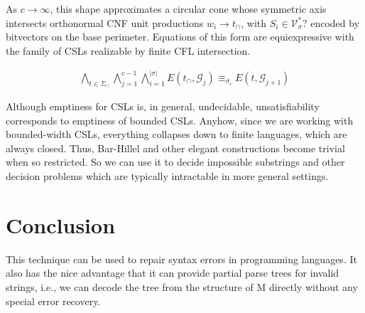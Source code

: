 \documentclass[sigplan,nonacm,anonymous]{acmart}\settopmatter{printfolios=false,printccs=false,printacmref=false}
\begin{document}
  \noindent As $c \rightarrow \infty$, this shape approximates a circular cone whose symmetric axis intersects orthonormal CNF unit productions $w_i \rightarrow t_\cap$, with $S_i \in \mathcal{V}^*_{\sigma}?$ encoded by bitvectors on the base perimeter. Equations of this form are equiexpressive with the family of CSLs realizable by finite CFL intersection.

 \begin{align}
  \bigwedge_{t\in\Sigma_\cap}\bigwedge_{j = 1}^{c-1}\bigwedge_{i=1}^{|\sigma|} E(t_{\cap}, \mathcal{G}_j) \equiv_{\sigma_i} E(t, \mathcal{G}_{j+1})
  \end{align}


  Although emptiness for CSLs is, in general, undecidable, unsatisfiability corresponds to emptiness of bounded CSLs. Anyhow, since we are working with bounded-width CSLs, everything collapses down to finite languages, which are always closed. Thus, Bar-Hillel and other elegant constructions become trivial when so restricted. So we can use it to decide impossible substrings and other decision problems which are typically intractable in more general settings.

  \section{Conclusion}

  This technique can be used to repair syntax errors in programming languages. It also has the nice advantage that it can provide partial parse trees for invalid strings, i.e., we can decode the tree from the structure of M directly without any special error recovery.
\end{document}

